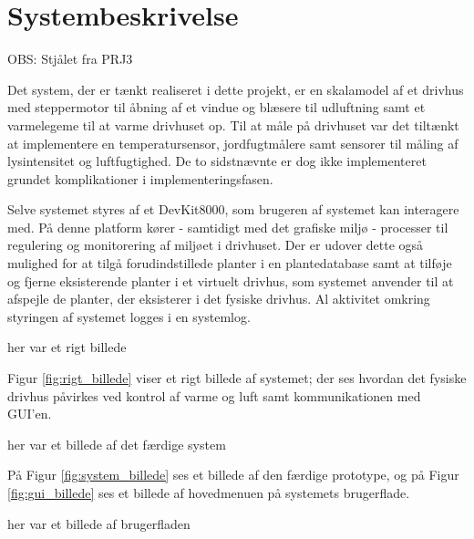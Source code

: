 \chapter{Systembeskrivelse} \label{ch:Systembeskrivelse}

OBS: Stjålet fra PRJ3

Det system, der er tænkt realiseret i dette projekt, er en skalamodel af et drivhus med steppermotor til åbning af et vindue og blæsere til udluftning samt et varmelegeme til at varme drivhuset op. 
Til at måle på drivhuset var det tiltænkt at implementere en temperatursensor, jordfugtmålere samt sensorer til måling af lysintensitet og luftfugtighed. 
De to sidstnævnte er dog ikke implementeret grundet komplikationer i implementeringsfasen.

Selve systemet styres af et DevKit8000, som brugeren af systemet kan interagere med.
På denne platform kører - samtidigt med det grafiske miljø - processer til regulering og monitorering af miljøet i drivhuset.
Der er udover dette også mulighed for at tilgå forudindstillede planter i en plantedatabase samt at tilføje og fjerne eksisterende planter i et virtuelt drivhus, som systemet anvender til at afspejle de planter, der eksisterer i det fysiske drivhus.
Al aktivitet omkring styringen af systemet logges i en systemlog.

her var et rigt billede

Figur \ref{fig:rigt_billede} viser et rigt billede af systemet; der ses hvordan det fysiske drivhus påvirkes ved kontrol af varme og luft samt kommunikationen med GUI'en.

\clearpage

her var et billede af det færdige system

På Figur \ref{fig:system_billede} ses et billede af den færdige prototype, og på Figur \ref{fig:gui_billede} ses et billede af hovedmenuen på systemets brugerflade.

her var et billede af brugerfladen